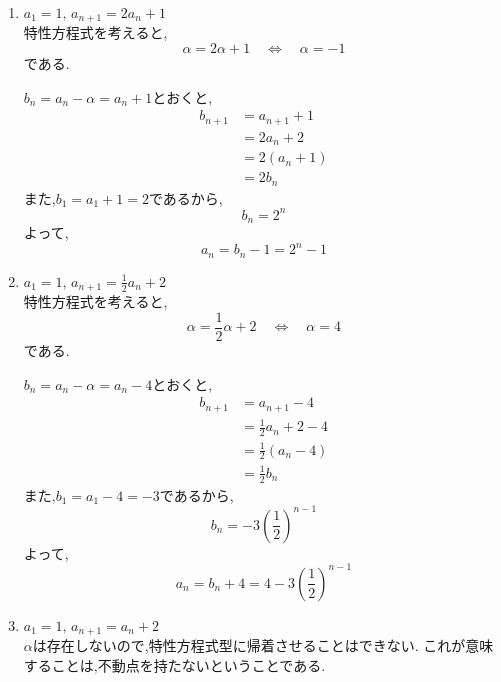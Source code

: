 \noindent{}
\begin{enumerate}[label=(\arabic*),parsep=3pt,format=\bookitemlink{example-characteristic-1}{solution}{problem}]
  \item $\displaystyle a_1=1,\,a_{n+1}=2a_n+1$\\
        特性方程式を考えると,
        \[
          \alpha=2\alpha+1
          \quad\Longleftrightarrow\quad
          \alpha=-1
        \]
        である.

        $b_n=a_n-\alpha=a_n+1$とおくと,
        \begin{align*}
          b_{n+1}
            &=a_{n+1}+1\\
            &=2a_n+2\\
            &=2(a_n+1)\\
            &=2b_n
        \end{align*}
        また,$b_1=a_1+1=2$であるから,
        \[
          b_n=2^n
        \]
        よって,
        \[
          a_n=b_n-1=2^n-1
        \]

  \item $\displaystyle a_1=1,\,a_{n+1}=\frac12a_n+2$\\
          特性方程式を考えると,
          \[
            \alpha=\frac12\alpha+2
            \quad\Longleftrightarrow\quad
            \alpha=4
          \]
          である.

          $b_n=a_n-\alpha=a_n-4$とおくと,
          \begin{align*}
            b_{n+1}
              &=a_{n+1}-4\\
              &=\frac12a_n+2-4\\
              &=\frac12(a_n-4)\\
              &=\frac12b_n
          \end{align*}
          また,$b_1=a_1-4=-3$であるから,
          \[
            b_n=-3\left(\frac12\right)^{n-1}
          \]
          よって,
          \[
            a_n=b_n+4
            =4-3\left(\frac12\right)^{n-1}
          \]
   \item $\displaystyle a_1=1,\, a_{n+1}=a_n+2$\\
         $\alpha$は存在しないので,特性方程式型に帰着させることはできない.
         これが意味することは,不動点を持たないということである.
\end{enumerate}

